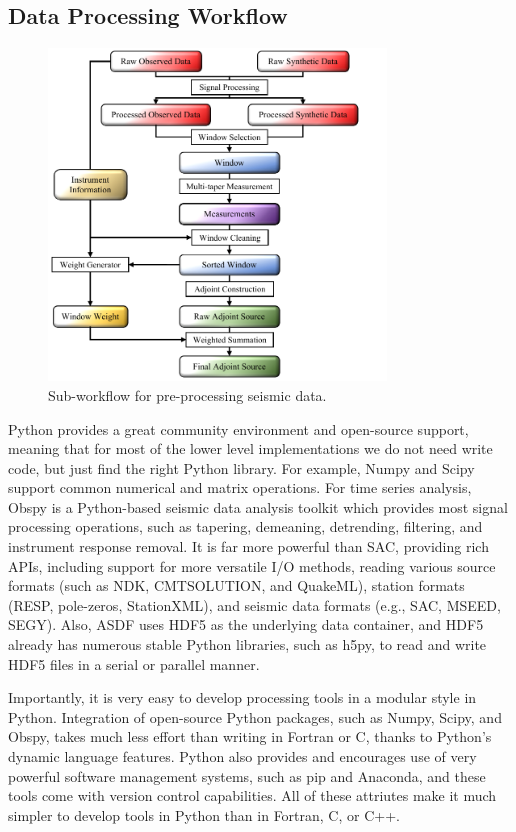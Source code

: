 \subsection{Data Processing Workflow}
\begin{figure}
  \centering
  \includegraphics[width=0.8\textwidth]{ch-GLADM25/figures/Preprocess_workflow.pdf}
  \caption[Sub-workflow for pre-processing seismic data]
  {\small{Sub-workflow for pre-processing seismic data.}}
  \label{fig:preprocess_workflow}
\end{figure}

Python provides a great community environment and open-source support,
meaning that for most
of the lower level implementations we do not need write code, but
just find the right Python library.
For example,
Numpy and Scipy support common numerical and matrix operations.
For time series analysis,
Obspy is a Python-based seismic data analysis toolkit which provides
most signal processing operations, such as tapering, demeaning, detrending, filtering, and instrument response removal.
It is far more powerful than SAC,
providing rich APIs, including support for more versatile I/O methods, reading
various source formats (such as NDK, CMTSOLUTION, and QuakeML),
station formats (RESP, pole-zeros, StationXML),
and seismic data formats (e.g., SAC, MSEED, SEGY).
Also, ASDF uses HDF5 as the underlying data container,
and HDF5 already has numerous stable Python libraries, such as h5py,
to read and write HDF5 files in a serial or parallel manner.

Importantly, it is very easy to develop processing tools in a modular style in Python.
Integration of open-source Python packages,
such as Numpy, Scipy, and Obspy, takes much
less effort than writing in Fortran or C, thanks to Python's dynamic language features.
Python also provides and encourages use of very powerful software management systems,
such as pip and Anaconda,
and these tools come with version control capabilities.
All of these attriutes make it much simpler to develop tools in Python than in
Fortran, C, or C++.

